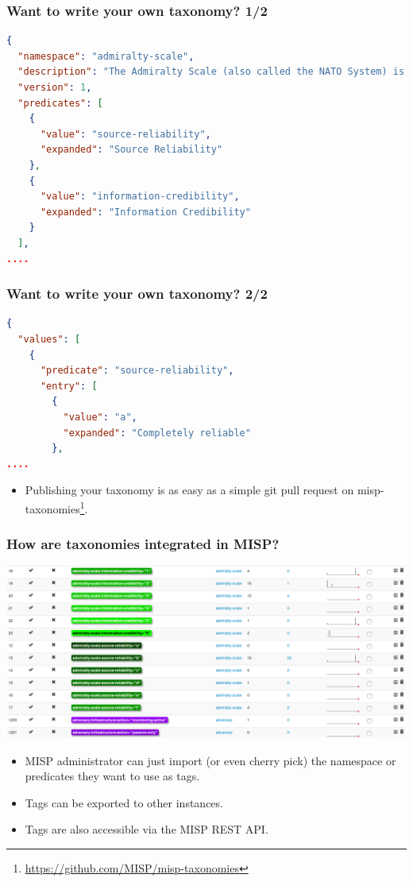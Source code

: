 \begin{frame}[fragile]
\frametitle{Want to write your own taxonomy? 1/2}
\begin{lstlisting}[language=json,firstnumber=1]
{
  "namespace": "admiralty-scale",
  "description": "The Admiralty Scale (also called the NATO System) is used to rank the reliability of a source and the credibility of an information.",
  "version": 1,
  "predicates": [
    {
      "value": "source-reliability",
      "expanded": "Source Reliability"
    },
    {
      "value": "information-credibility",
      "expanded": "Information Credibility"
    }
  ],
....
\end{lstlisting}
\end{frame}

\begin{frame}[fragile]
\frametitle{Want to write your own taxonomy? 2/2}
\begin{lstlisting}[language=json,firstnumber=1]
{
  "values": [
    {
      "predicate": "source-reliability",
      "entry": [
        {
          "value": "a",
          "expanded": "Completely reliable"
        },
....
\end{lstlisting}
\begin{itemize}
        \item Publishing your taxonomy is as easy as a simple git pull request on misp-taxonomies\footnote{\url{https://github.com/MISP/misp-taxonomies}}.
\end{itemize}
\end{frame}

\begin{frame}
\frametitle{How are taxonomies integrated in MISP?}
        \includegraphics[scale=0.21]{tags-2-4-70.png}
\begin{itemize}
        \item MISP administrator can just import (or even cherry pick) the namespace or predicates they want to use as tags.
\item Tags can be exported to other instances.
\item Tags are also accessible via the MISP REST API.
\end{itemize}
\end{frame}


